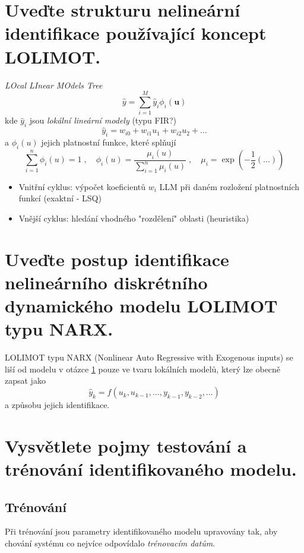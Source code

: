 \documentclass{article}
\begin{document}
	\section{Uveďte strukturu nelineární identifikace používající koncept LOLIMOT. } \label{lolimot}
	\emph{LOcal LInear MOdels Tree}
	\begin{equation}
		\hat{y} = \sum_{i=1}^M \hat{y}_i \phi_i(\bm{u})
	\end{equation}
	kde $\hat{y}_i$ jsou \emph{lokální lineární modely} (typu FIR?)
	\begin{equation}
		\hat{y}_i = w_{i0} + w_{i1} u_1 + w_{i2} u_2 + \dots
	\end{equation}
	a $\phi_i(u)$ jejich platnostní funkce, které splňují
	\begin{equation}
		\sum_{i=1}^n \phi_i(u) = 1
		\;,\quad 
		\phi_i(u) = \frac{\mu_i(u)}{\sum_{i=1}^n \mu_i(u)}
		\;,\quad 
		\mu_i = \exp(-\frac{1}{2}(...))
	\end{equation}

	\begin{itemize}
	\item Vnitřní cyklus: výpočet koeficientů $w_i$ LLM při daném rozložení platnostních funkcí (exaktní - LSQ)
	\item Vnější cyklus: hledání vhodného "rozdělení" oblasti (heuristika)
	\end{itemize}


	\section{Uveďte postup identifikace nelineárního diskrétního dynamického modelu LOLIMOT typu NARX. }

	LOLIMOT typu NARX (Nonlinear Auto Regressive with Exogenous inputs) se liší od modelu v otázce \ref{lolimot} pouze ve tvaru lokálních modelů, který lze obecně zapsat jako
	\begin{equation}
		\hat{y}_k = f(u_k,u_{k-1},\dots,y_{k-1},y_{k-2},\dots)
	\end{equation}
	a způsobu jejich identifikace.

	\section{Vysvětlete pojmy testování a trénování identifikovaného modelu.}

	\subsection*{Trénování}
	Při trénování jsou parametry identifikovaného modelu upravovány tak, aby chování systému co nejvíce odpovídalo \emph{trénovacím datům}.
\end{document}
